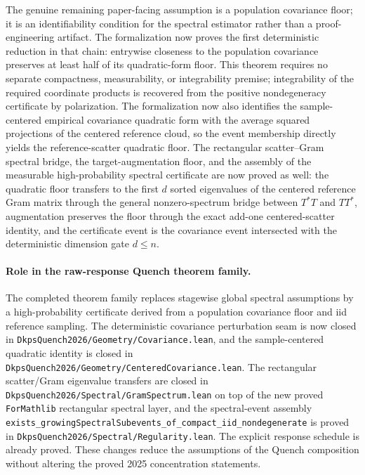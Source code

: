 \documentclass[11pt]{article}
\newcommand{\code}[1]{\texttt{#1}}
\begin{document}
The genuine remaining paper-facing assumption is a population covariance
floor; it is an identifiability condition for the spectral estimator rather than
a proof-engineering artifact.  The formalization now proves the first
deterministic reduction in that chain: entrywise closeness to the population
covariance preserves at least half of its quadratic-form floor.  This theorem
requires no separate compactness, measurability, or integrability premise;
integrability of the required coordinate products is recovered from the
positive nondegeneracy certificate by polarization.  The formalization now
also identifies the sample-centered empirical covariance quadratic form with
the average squared projections of the centered reference cloud, so the event
membership directly yields the reference-scatter quadratic floor.  The
rectangular scatter--Gram spectral bridge, the target-augmentation floor, and
the assembly of the measurable high-probability spectral certificate are now
proved as well: the quadratic floor transfers to the first $d$ sorted
eigenvalues of the centered reference Gram matrix through the general
nonzero-spectrum bridge between $T^*T$ and $TT^*$, augmentation preserves the
floor through the exact add-one centered-scatter identity, and the certificate
event is the covariance event intersected with the deterministic dimension
gate $d \le n$.


\paragraph{Role in the raw-response Quench theorem family.}
The completed theorem family replaces stagewise global spectral assumptions by a
high-probability certificate derived from a population covariance floor and iid
reference sampling.  The deterministic covariance perturbation seam is now
closed in \code{DkpsQuench2026/Geometry/Covariance.lean}, and the sample-centered
quadratic identity is closed in \code{DkpsQuench2026/Geometry/CenteredCovariance.lean}.
The rectangular scatter/Gram eigenvalue transfers are closed in
\code{DkpsQuench2026/Spectral/GramSpectrum.lean} on top of the new proved
\code{ForMathlib} rectangular spectral layer, and the spectral-event assembly
\code{exists\_growingSpectralSubevents\_of\_compact\_iid\_nondegenerate} is
proved in \code{DkpsQuench2026/Spectral/Regularity.lean}.  The explicit response
schedule is already proved.  These changes reduce the assumptions of the
Quench composition without altering the proved 2025 concentration statements.
\end{document}
